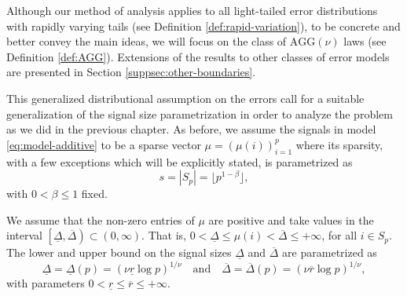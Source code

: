 Although our method of analysis applies to all light-tailed error distributions with rapidly varying tails (see Definition \ref{def:rapid-variation}), to be concrete and better convey the main ideas, we will focus on the class of $\mathrm{AGG}(\nu)$ laws (see Definition \ref{def:AGG}).
Extensions of the results to other classes of error models are presented in Section \ref{suppsec:other-boundaries}.

This generalized distributional assumption on the errors call for a suitable generalization of the signal size parametrization in order to analyze the problem as we did in the previous chapter.
As before, we assume the signals in model \eqref{eq:model-additive} to be a sparse vector $\mu = \left(\mu(i)\right)_{i=1}^p$ where its sparsity, with a few exceptions which will be explicitly stated, is parametrized as
\begin{equation} \label{eq:sparsity-parametrized}
   s = |S_p| = \lfloor p^{1 -\beta} \rfloor, %
\end{equation}
with $0 < \beta \le 1$ fixed.

We assume that the non-zero entries of $\mu$ are positive and take values in the interval $\left[\underline{\Delta},\overline{\Delta}\right)\subset (0,\infty)$.
That is, $0<\underline{\Delta}\le\mu(i)<\overline{\Delta}\le+\infty$, for all $i\in S_p$.
The lower and upper bound on the signal sizes $\underline{\Delta}$ and $\overline{\Delta}$ are parametrized as
\begin{equation} \label{eq:signal-size-parametrized}
    \underline{\Delta} = \underline{\Delta}(p) = (\nu \underline{r} \log{p})^{1/\nu} \quad \text{and} \quad
    \overline{\Delta} = \overline{\Delta}(p)  = (\nu \overline{r} \log{p})^{1/\nu},
\end{equation}
with parameters $0 < \underline{r} \le \overline{r} \le +\infty$.


